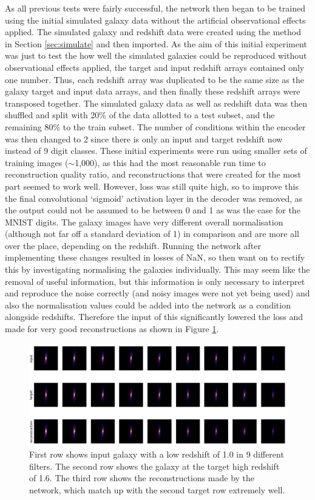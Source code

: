 \documentclass[fleqn,usenatbib]{mnras}
\begin{document}
As all previous tests were fairly successful, the network then began to be trained using the initial simulated galaxy data without the artificial observational effects applied. The simulated galaxy and redshift data were created using the method in Section \ref{sec:simulate} and then imported. As the aim of this initial experiment was just to test the how well the simulated galaxies could be reproduced without observational effects applied, the target and input redshift arrays contained only one number. Thus, each redshift array was duplicated to be the same size as the galaxy target and input data arrays, and then finally these redshift arrays were transposed together. The simulated galaxy data as well as redshift data was then shuffled and split with 20\% of the data allotted to a test subset, and the remaining 80\% to the train subset. The number of conditions within the encoder was then changed to 2 since there is only an input and target redshift now instead of 9 digit classes. These initial experiments were run using smaller sets of training images ($\sim$1,000), as this had the most reasonable run time to reconstruction quality ratio, and reconstructions that were created for the most part seemed to work well. However, loss was still quite high, so to improve this the final convolutional ‘sigmoid’ activation layer in the decoder was removed, as the output could not be assumed to be between 0 and 1 as was the case for the MNIST digits. The galaxy images have very different overall normalisation (although not far off a standard deviation of 1) in comparison and are more all over the place, depending on the redshift. Running the network after implementing these changes resulted in losses of NaN, so then want on to rectify this by investigating normalising the galaxies individually. This may seem like the removal of useful information, but this information is only necessary to interpret and reproduce the noise correctly (and noisy images were not yet being used) and also the normalisation values could be added into the network as a condition alongside redshifts. Therefore the input of this significantly lowered the loss and made for very good reconstructions as shown in Figure \ref{fig:gal_1}. 

\begin{figure}
	\includegraphics[width=1.85\columnwidth]{Figure_62a.png}
    \caption{First row shows input galaxy with a low redshift of 1.0  in 9 different filters. The second row shows the galaxy at the target high redshift of 1.6. The third row shows the reconstructions made by the network, which match up with the second target row extremely well.}
    \label{fig:gal_1}
\end{figure}
\end{document}
